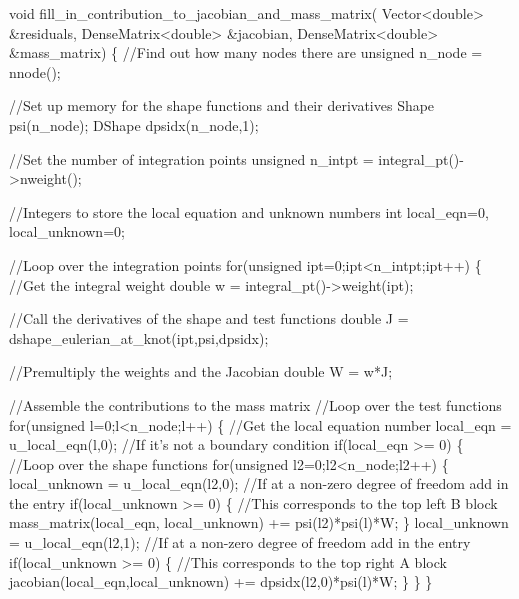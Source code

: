\begin{DoxyCodeInclude}
 \textcolor{keywordtype}{void} fill\_in\_contribution\_to\_jacobian\_and\_mass\_matrix(
  Vector<double> &residuals,
  DenseMatrix<double> &jacobian, DenseMatrix<double> &mass\_matrix)
  \{
   \textcolor{comment}{//Find out how many nodes there are}
   \textcolor{keywordtype}{unsigned} n\_node = nnode();
   
   \textcolor{comment}{//Set up memory for the shape functions and their derivatives}
   Shape psi(n\_node);
   DShape dpsidx(n\_node,1);

   \textcolor{comment}{//Set the number of integration points}
   \textcolor{keywordtype}{unsigned} n\_intpt = integral\_pt()->nweight();
   
   \textcolor{comment}{//Integers to store the local equation and unknown numbers}
   \textcolor{keywordtype}{int} local\_eqn=0, local\_unknown=0;
   
   \textcolor{comment}{//Loop over the integration points}
   \textcolor{keywordflow}{for}(\textcolor{keywordtype}{unsigned} ipt=0;ipt<n\_intpt;ipt++)
    \{
     \textcolor{comment}{//Get the integral weight}
     \textcolor{keywordtype}{double} w = integral\_pt()->weight(ipt);
     
     \textcolor{comment}{//Call the derivatives of the shape and test functions}
     \textcolor{keywordtype}{double} J = dshape\_eulerian\_at\_knot(ipt,psi,dpsidx);
     
     \textcolor{comment}{//Premultiply the weights and the Jacobian}
     \textcolor{keywordtype}{double} W = w*J;

     \textcolor{comment}{//Assemble the contributions to the mass matrix}
     \textcolor{comment}{//Loop over the test functions}
     \textcolor{keywordflow}{for}(\textcolor{keywordtype}{unsigned} l=0;l<n\_node;l++)
      \{
       \textcolor{comment}{//Get the local equation number}
       local\_eqn = u\_local\_eqn(l,0);
       \textcolor{comment}{//If it's not a boundary condition}
       \textcolor{keywordflow}{if}(local\_eqn >= 0)
        \{
         \textcolor{comment}{//Loop over the shape functions}
         \textcolor{keywordflow}{for}(\textcolor{keywordtype}{unsigned} l2=0;l2<n\_node;l2++)
          \{ 
           local\_unknown = u\_local\_eqn(l2,0);
           \textcolor{comment}{//If at a non-zero degree of freedom add in the entry}
           \textcolor{keywordflow}{if}(local\_unknown >= 0)
            \{
             \textcolor{comment}{//This corresponds to the top left B block}
             mass\_matrix(local\_eqn, local\_unknown) += psi(l2)*psi(l)*W;
            \}
           local\_unknown = u\_local\_eqn(l2,1);
           \textcolor{comment}{//If at a non-zero degree of freedom add in the entry}
           \textcolor{keywordflow}{if}(local\_unknown >= 0)
            \{
             \textcolor{comment}{//This corresponds to the top right A block}
             jacobian(local\_eqn,local\_unknown) += dpsidx(l2,0)*psi(l)*W;
            \}
          \}
        \}


\end{DoxyCodeInclude}
